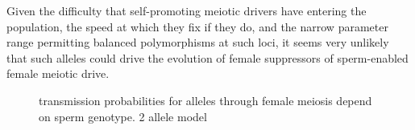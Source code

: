 \documentclass[12pt,letterpaper]{article}
\newcommand{\gc}[1]{{ \color{red} #1}}
\begin{document}

Given the difficulty that self-promoting meiotic drivers have entering the population, the speed at
which they fix if they do, and the narrow parameter range permitting balanced polymorphisms at such loci,  
it seems very unlikely that such alleles could drive the evolution of female suppressors of sperm-enabled
female meiotic drive.

\begin{figure}
\caption{transmission probabilities for alleles through female
  meiosis depend on sperm genotype. 2 allele model}  
\label{Eggsperm_2_allele_cartoon}
\end{figure}
\end{document}
